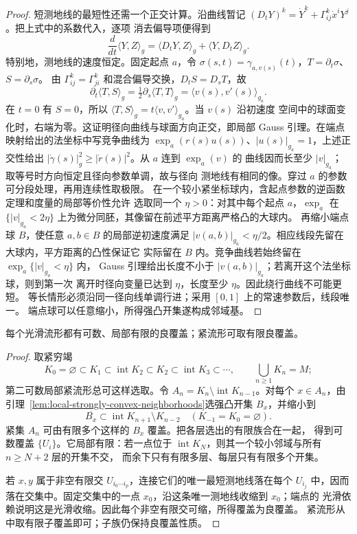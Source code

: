 \begin{proof}
短测地线的最短性还需一个正交计算。沿曲线暂记
$(D_tY)^k=\dot Y^k+\Gamma^k_{ij}\dot x^iY^j$。把上式中的系数代入，逐项
消去偏导项便得到
\[
 \frac{d}{dt}\langle Y,Z\rangle_g
 =\langle D_tY,Z\rangle_g+\langle Y,D_tZ\rangle_g.
\]
特别地，测地线的速度恒定。固定起点 $a$，令
$\sigma(s,t)=\gamma_{a,v(s)}(t)$，$T=\partial_t\sigma$、$S=\partial_s\sigma$。
由 $\Gamma^k_{ij}=\Gamma^k_{ji}$ 和混合偏导交换，$D_tS=D_sT$，故
\[
 \partial_t\langle T,S\rangle_g
 =\tfrac12\partial_s\langle T,T\rangle_g
 =\langle v(s),v'(s)\rangle_{g_a}.
\]
在 $t=0$ 有 $S=0$，所以
$\langle T,S\rangle_g=t\langle v,v'\rangle_{g_a}$。当 $v(s)$ 沿初速度
空间中的球面变化时，右端为零。这证明径向曲线与球面方向正交，即局部
Gauss 引理。在端点映射给出的法坐标中写竞争曲线为
$\exp_a(r(s)u(s))$、$|u(s)|_{g_a}=1$，上述正交性给出
$|\dot\gamma(s)|_g^2\geq|\dot r(s)|^2$。从 $a$ 连到 $\exp_a(v)$ 的
曲线因而长至少 $|v|_{g_a}$；取等号时方向恒定且径向参数单调，故与径向
测地线有相同的像。穿过 $a$ 的参数可分段处理，再用连续性取极限。
在一个较小紧坐标球内，含起点参数的逆函数定理和度量的局部等价性允许
选取同一个 $\eta>0$：对其中每个起点 $a$，$\exp_a$ 在
$\{|v|_{g_a}<2\eta\}$ 上为微分同胚，其像留在前述平方距离严格凸的大球内。
再缩小端点球 $B$，使任意 $a,b\in B$ 的局部逆初速度满足
$|v(a,b)|_{g_a}<\eta/2$。相应线段先留在大球内，平方距离的凸性保证它
实际留在 $B$ 内。竞争曲线若始终留在 $\exp_a\{|v|_{g_a}<\eta\}$ 内，
Gauss 引理给出长度不小于 $|v(a,b)|_{g_a}$；若离开这个法坐标球，则到第一次
离开时径向变量已达到 $\eta$，长度至少 $\eta$。因此绕行曲线不可能更短。
等长情形必须沿同一径向线单调行进；采用 $[0,1]$ 上的常速参数后，线段唯一。
端点球可以任意缩小，所得强凸开集遂构成邻域基。
\end{proof}

\begin{lemma}[良覆盖]\label{lem:smooth-good-cover}
每个光滑流形都有可数、局部有限的良覆盖；紧流形可取有限良覆盖。
\end{lemma}
\begin{proof}
取紧穷竭
\[
 K_0=\varnothing\subset K_1\subset\operatorname{int}K_2\subset K_2
 \subset\operatorname{int}K_3\subset\cdots,
 \qquad \bigcup_{n\geq1}K_n=M;
\]
第二可数局部紧流形总可这样选取。令
$A_n=K_n\setminus\operatorname{int}K_{n-1}$。对每个 $x\in A_n$，由
引理~\ref{lem:local-strongly-convex-neighborhoods}选强凸开集 $B_x$，并缩小到
\[
 \overline{B_x}\subset
 \operatorname{int}K_{n+1}\setminus K_{n-2}
 \quad(K_{-1}=K_0=\varnothing).
\]
紧集 $A_n$ 可由有限多个这样的 $B_x$ 覆盖。把各层选出的有限族合在一起，
得到可数覆盖 $\{U_i\}$。它局部有限：若一点位于
$\operatorname{int}K_N$，则其一个较小邻域与所有 $n\geq N+2$ 层的开集不交，
而余下只有有限多层、每层只有有限多个开集。

若 $x,y$ 属于非空有限交
$U_{i_0\cdots i_p}$，连接它们的唯一最短测地线落在每个 $U_{i_j}$ 中，因而
落在交集中。固定交集中的一点 $x_0$，沿这条唯一测地线收缩到 $x_0$；端点的
光滑依赖说明这是光滑收缩。因此每个非空有限交可缩，所得覆盖为良覆盖。
紧流形从中取有限子覆盖即可；子族仍保持良覆盖性质。
\end{proof}


